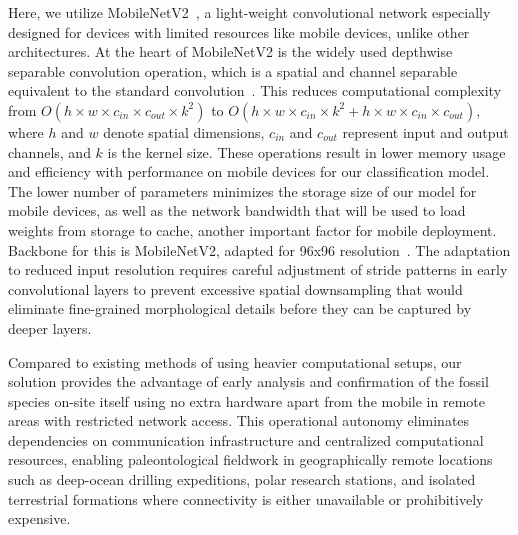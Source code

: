 \documentclass[a4paper,fleqn]{cas-sc}
\begin{document}
Here, we utilize MobileNetV2~\cite{sandler2018mobilenetv2}, a light-weight convolutional network especially designed for devices with limited resources like mobile devices, unlike other architectures. At the heart of MobileNetV2 is the widely used depthwise separable convolution operation, which is a spatial and channel separable equivalent to the standard convolution~\cite{sandler2018mobilenetv2}. This reduces computational complexity from \(O(h \times w \times c_{in} \times c_{out} \times k^2)\) to \(O(h \times w \times c_{in} \times k^2 + h \times w \times c_{in} \times c_{out})\), where \(h\) and \(w\) denote spatial dimensions, \(c_{in}\) and \(c_{out}\) represent input and output channels, and \(k\) is the kernel size.
These operations result in lower memory usage and efficiency with performance on mobile devices for our classification model. The lower number of parameters minimizes the storage size of our model for mobile devices, as well as the network bandwidth that will be used to load weights from storage to cache, another important factor for mobile deployment. 
Backbone for this is MobileNetV2, adapted for 96x96 resolution~\cite{sandler2018mobilenetv2}. The adaptation to reduced input resolution requires careful adjustment of stride patterns in early convolutional layers to prevent excessive spatial downsampling that would eliminate fine-grained morphological details before they can be captured by deeper layers.

Compared to existing methods of using heavier computational setups, our solution provides the advantage of early analysis and confirmation of the fossil species on-site itself using no extra hardware apart from the mobile in remote areas with restricted network access. This operational autonomy eliminates dependencies on communication infrastructure and centralized computational resources, enabling paleontological fieldwork in geographically remote locations such as deep-ocean drilling expeditions, polar research stations, and isolated terrestrial formations where connectivity is either unavailable or prohibitively expensive.
\end{document}
